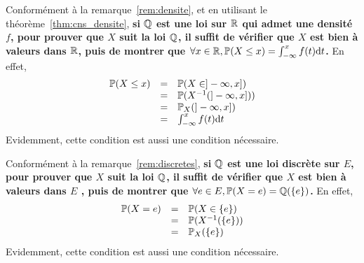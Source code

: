\documentclass[../integ-proba.tex]{subfiles}
\begin{document}
    \begin{rem}
        Conformément à la remarque~\ref{rem:densite}, et en utilisant le théorème~\ref{thm:cns_densite}, \textbf{si $\mathbb{Q}$ est une loi sur $\mathbb{R}$ qui admet une densité $f$, pour prouver que $X$ suit la loi $\mathbb{Q}$, il suffit de vérifier que $X$ est bien à valeurs dans $\mathbb{R}$, puis de montrer que $\forall x \in \mathbb{R}, \mathbb{P}(X \leq x) = \int_{-\infty}^x f(t) \textnormal{d}t$.}
        En effet,
        \begin{displaymath}
            \begin{array}{rcl}
                \mathbb{P}(X \leq x) & = & \mathbb{P}(X \in ]-\infty, x]) \\
                           & = & \mathbb{P}(X^{-1}(]-\infty, x])) \\
                           & = & \mathbb{P}_X(]-\infty, x]) \\
                           & = & \int_{-\infty}^x f(t) \textnormal{d}t
            \end{array}
        \end{displaymath}
        Evidemment, cette condition est aussi une condition nécessaire.
    \end{rem}

    \begin{rem}
        Conformément à la remarque~\ref{rem:discretes}, \textbf{si $\mathbb{Q}$ est une loi discrète sur $E$, pour prouver que $X$ suit la loi $\mathbb{Q}$, il suffit de vérifier que $X$ est bien à valeurs dans $E$ , puis de montrer que $\forall e \in E, \mathbb{P}(X = e) = \mathbb{Q}(\left\{ e \right\})$.}
        En effet,
        \begin{displaymath}
            \begin{array}{rcl}
                \mathbb{P}(X = e) & = & \mathbb{P}(X \in \left\{ e \right\}) \\
                           & = & \mathbb{P}(X^{-1}(\left\{ e \right\})) \\
                           & = & \mathbb{P}_X(\left\{ e \right\})
            \end{array}
        \end{displaymath}
        Evidemment, cette condition est aussi une condition nécessaire.
    \end{rem}
\end{document}
